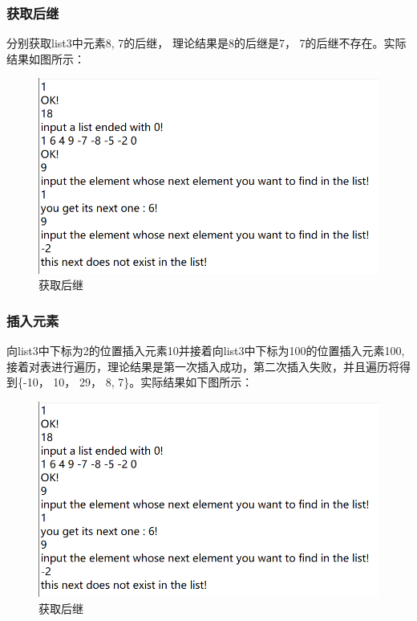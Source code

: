 \documentclass[supercite]{Experimental_Report}
\theoremstyle{definition}
\begin{document}
\subsubsection{获取后继}
分别获取list3中元素8, 7的后继， 理论结果是8的后继是7， 7的后继不存在。实际结果如图所示：
\begin{figure}[htbp]
	\centering
	\includegraphics[scale = 0.7]{images/8.png}
	\caption{获取后继}
\end{figure}

\subsubsection{插入元素}
向list3中下标为2的位置插入元素10并接着向list3中下标为100的位置插入元素100,接着对表进行遍历，理论结果是第一次插入成功，第二次插入失败，并且遍历将得到\{-10， 10， 29， 8, 7\}。实际结果如下图所示：
\begin{figure}[htbp]
	\centering
	\includegraphics[scale = 0.7]{images/8.png}
	\caption{获取后继}
\end{figure}
\end{document}
